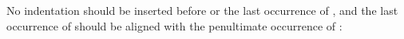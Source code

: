 \documentclass{article}
\begin{document}
No indentation should be inserted before  or
the last occurrence of , and the last
occurrence of  should be aligned with the
penultimate occurrence of :
\begin{code}%
%
\>[2]\<%
\\
\>[2][@{}l@{\AgdaIndent{0}}]%
\>[4]%
\>[7]\AgdaSymbol{:}\AgdaSpace{}%
\<%
\\
%
\>[4]%
\>[7]\AgdaSymbol{:}%
\>[1I]\AgdaSpace{}%
\<%
\\
\>[.]\<[1I]%
\>[9]\<%
\end{code}
\end{document}
